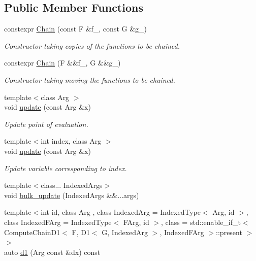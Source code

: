 \subsection*{Public Member Functions}
\begin{DoxyCompactItemize}
\item 
constexpr \hyperlink{structFunG_1_1MathematicalOperations_1_1Chain_aea55b97629df71369488750410e0c66d}{Chain} (const F \&f\+\_\+, const G \&g\+\_\+)
\begin{DoxyCompactList}\small\item\em Constructor taking copies of the functions to be chained. \end{DoxyCompactList}\item 
constexpr \hyperlink{structFunG_1_1MathematicalOperations_1_1Chain_a4323e75022efde2e066df2ef11010b21}{Chain} (F \&\&f\+\_\+, G \&\&g\+\_\+)
\begin{DoxyCompactList}\small\item\em Constructor taking moving the functions to be chained. \end{DoxyCompactList}\item 
{\footnotesize template$<$class Arg $>$ }\\void \hyperlink{structFunG_1_1MathematicalOperations_1_1Chain_adb7f63859ef7dbdd08b0908c3a17794d}{update} (const Arg \&x)
\begin{DoxyCompactList}\small\item\em Update point of evaluation. \end{DoxyCompactList}\item 
{\footnotesize template$<$int index, class Arg $>$ }\\void \hyperlink{structFunG_1_1MathematicalOperations_1_1Chain_aa41d754e68072e0a9f1460da79f9913e}{update} (const Arg \&x)
\begin{DoxyCompactList}\small\item\em Update variable corresponding to index. \end{DoxyCompactList}\item 
{\footnotesize template$<$class... Indexed\+Args$>$ }\\void \hyperlink{structFunG_1_1MathematicalOperations_1_1Chain_a3be7df8e2b9476fa9f6f7f737b65fef9}{bulk\+\_\+update} (Indexed\+Args \&\&...args)
\item 
{\footnotesize template$<$int id, class Arg , class Indexed\+Arg  = Indexed\+Type$<$ Arg, id $>$, class Indexed\+F\+Arg  = Indexed\+Type$<$ F\+Arg, id $>$, class  = std\+::enable\+\_\+if\+\_\+t$<$                           Compute\+Chain\+D1$<$ F, D1$<$ G, Indexed\+Arg $>$, Indexed\+F\+Arg $>$\+::present $>$$>$ }\\auto \hyperlink{structFunG_1_1MathematicalOperations_1_1Chain_adfe741dee89257258b39df846fd16cf7}{d1} (Arg const \&dx) const 

\end{DoxyCompactItemize}
